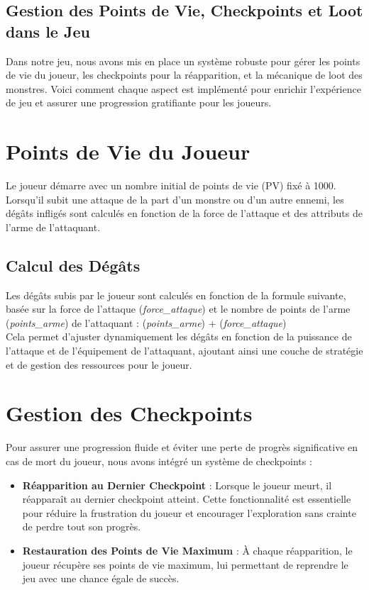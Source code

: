 \subsection{Gestion des Points de Vie, Checkpoints et Loot dans le Jeu}

Dans notre jeu, nous avons mis en place un système robuste pour gérer les points de vie du joueur, 
les checkpoints pour la réapparition, et la mécanique de loot des monstres. Voici comment chaque aspect 
est implémenté pour enrichir l'expérience de jeu et assurer une progression gratifiante pour les joueurs.

\section*{Points de Vie du Joueur}

Le joueur démarre avec un nombre initial de points de vie (PV) fixé à 1000. Lorsqu'il subit une attaque de la part d'un monstre ou d'un autre ennemi,
 les dégâts infligés sont calculés en fonction de la force de l'attaque et des attributs de l'arme de l'attaquant.

\subsection*{Calcul des Dégâts}

Les dégâts subis par le joueur sont calculés en fonction de la formule suivante, basée sur la force de l'attaque 
(\textit{force\_attaque}) et le nombre de points de l'arme (\textit{points\_arme}) de l'attaquant : (\textit{points\_arme}) + (\textit{force\_attaque})
\\

Cela permet d'ajuster dynamiquement les dégâts en fonction de la puissance de l'attaque et de 
l'équipement de l'attaquant, ajoutant ainsi une couche de stratégie et de gestion des ressources pour le joueur.

\section*{Gestion des Checkpoints}

Pour assurer une progression fluide et éviter une perte de progrès significative en cas de mort du joueur, nous avons intégré un système de checkpoints :
\\

\begin{itemize}
    \item \textbf{Réapparition au Dernier Checkpoint} : Lorsque le joueur meurt, il réapparaît au dernier checkpoint atteint. Cette fonctionnalité est essentielle pour réduire la frustration du joueur et encourager l'exploration sans crainte de perdre tout son progrès.
    \\

    \item \textbf{Restauration des Points de Vie Maximum} : À chaque réapparition, le joueur récupère ses points de vie maximum, lui permettant de reprendre le jeu avec une chance égale de succès.
\end{itemize}

